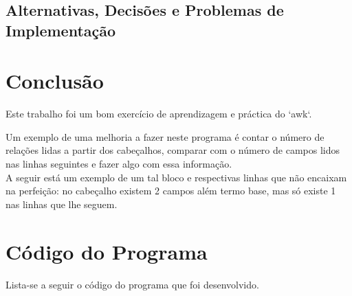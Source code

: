 \documentclass{report}
\begin{document}
\section{Alternativas, Decisões e Problemas de Implementação}

\chapter{Conclusão} \label{concl}
Este trabalho foi um bom exercício de aprendizagem e práctica do `awk`.

Um exemplo de uma melhoria a fazer neste programa é contar o número de relações lidas a partir dos cabeçalhos, comparar com o número de campos lidos nas linhas seguintes e fazer algo com essa informação.\\
A seguir está um exemplo de um tal bloco e respectivas linhas que não encaixam na perfeição: no cabeçalho existem 2 campos além termo base, mas só existe 1 nas linhas que lhe seguem.


\appendix
\chapter{Código do Programa}

Lista-se a seguir o código do programa que foi desenvolvido.




\end{document}
